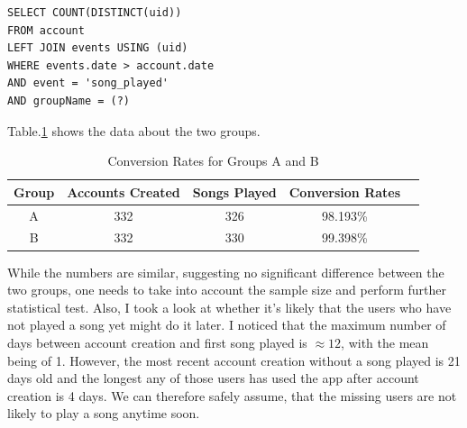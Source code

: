 \documentclass[paper=a4, fontsize=10pt]{report}
\begin{document}
\footnotesize
\begin{lstlisting}[frame=single,caption=Return conversion rates \label{code:sql_average_fixed_table}]
SELECT COUNT(DISTINCT(uid)) 
FROM account 
LEFT JOIN events USING (uid)
WHERE events.date > account.date
AND event = 'song_played'
AND groupName = (?)
\end{lstlisting}
\normalsize

Table.\ref{tab:conversion_rates} shows the data about the two groups.
\begin{table}[htbp]
\normalsize

  \centering
  \caption{Conversion Rates for Groups A and B}
    \begin{tabular}{ccccc}
    \toprule
    \textbf{Group } & \textbf{Accounts Created} & \textbf{Songs Played} & \textbf{Conversion Rates} \\
    \midrule
    A & 332  &  326  & 98.193\%  \\
    B & 332   & 330   & 99.398\%   \\
    \bottomrule
    \end{tabular}%
  \label{tab:conversion_rates}%
\end{table}%
\normalsize
While the numbers are similar, suggesting no significant difference between the two groups, one needs to take into account the sample size and perform
further statistical test. Also, I took a look at whether it's likely that the users who have not played a song yet might
do it later. I noticed that the maximum number of days between account creation and first song played is $\approx 12$, with the mean
being of 1. However, the most recent account creation without a song played is 21 days old and the longest any of those
users has used the app after account creation is 4 days. We can therefore safely assume, that the missing users are not likely
to play a song anytime soon.
\end{document}
